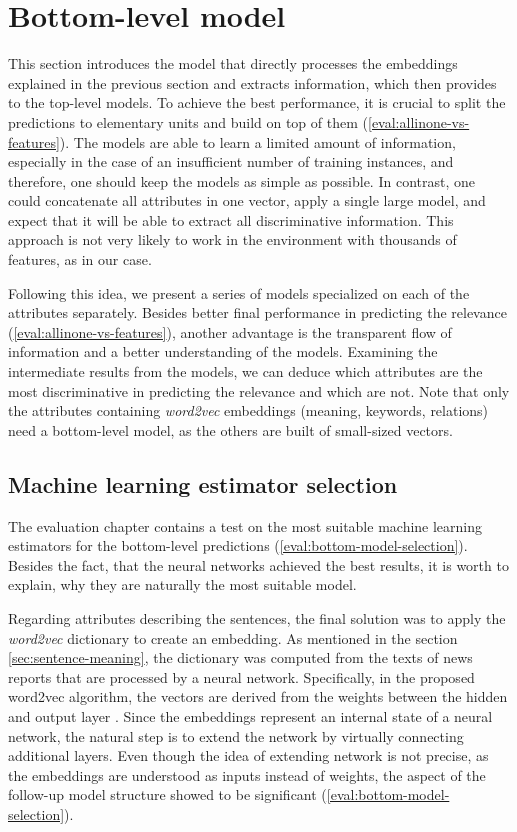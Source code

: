 \documentclass[
  digital, %
  notable,   %
  nolof,     %
  nolot,     %
]{fithesis3}
\begin{document}
\section{Bottom-level model}
\label{sec:bottom-level-models}
This section introduces the model that directly processes the embeddings explained in the previous section and extracts information, which then provides to the top-level models.
To achieve the best performance, it is crucial to split the predictions to elementary units and build on top of them (\ref{eval:allinone-vs-features}).
The models are able to learn a limited amount of information, especially in the case of an insufficient number of training instances, and therefore, one should keep the models as simple as possible.
In contrast, one could concatenate all attributes in one vector, apply a single large model, and expect that it will be able to extract all discriminative information.
This approach is not very likely to work in the environment with thousands of features, as in our case.

Following this idea, we present a series of models specialized on each of the attributes separately.
Besides better final performance in predicting the relevance (\ref{eval:allinone-vs-features}), another advantage is the transparent flow of information and a better understanding of the models.
Examining the intermediate results from the models, we can deduce which attributes are the most discriminative in predicting the relevance and which are not.
Note that only the attributes containing \textit{word2vec} embeddings (meaning, keywords, relations) need a bottom-level model, as the others are built of small-sized vectors.

\subsection{Machine learning estimator selection}
\label{sec:bottom-level-nn}
The evaluation chapter contains a test on the most suitable machine learning estimators for the bottom-level predictions (\ref{eval:bottom-model-selection}).
Besides the fact, that the neural networks achieved the best results, it is worth to explain, why they are naturally the most suitable model.

Regarding attributes describing the sentences, the final solution was to apply the \textit{word2vec} dictionary to create an embedding.
As mentioned in the section \ref{sec:sentence-meaning}, the dictionary was computed from the texts of news reports that are processed by a neural network.
Specifically, in the proposed word2vec algorithm, the vectors are derived from the weights between the hidden and output layer \cite[sec. 2.2.1]{wordEmbeddings}.
Since the embeddings represent an internal state of a neural network, the natural step is to extend the network by virtually connecting additional layers.
Even though the idea of extending network is not precise, as the embeddings are understood as inputs instead of weights, the aspect of the follow-up model structure showed to be significant (\ref{eval:bottom-model-selection}).
\end{document}
